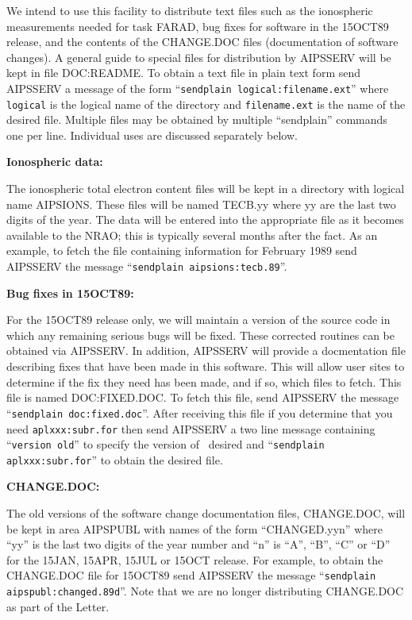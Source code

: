    We intend to use this facility to distribute text files such as the
ionospheric measurements needed for task FARAD, bug fixes for software
in the 15OCT89 release, and the contents of the CHANGE.DOC files
(documentation of software changes).  A general guide to special files
for distribution by AIPSSERV will be kept in file DOC:README.  To
obtain a text file in plain text form send AIPSSERV a message of the
form ``{\tt sendplain logical:filename.ext}'' where {\tt logical} is the
logical name of the directory and {\tt filename.ext} is the name of the
desired file.  Multiple files may be obtained by multiple
``sendplain'' commands one per line.  Individual uses are discussed
separately below.

{\bf Ionospheric data:}

   The ionospheric total electron content files will be kept in a
directory with logical name AIPSIONS.  These files  will be named
TECB.yy where yy are the last two digits of the year.  The data will
be entered into the appropriate file as it becomes available to the
NRAO; this is typically several months after the fact.
As an example, to fetch the file containing information for
February 1989 send AIPSSERV the message ``{\tt sendplain
aipsions:tecb.89}''.


{\bf Bug fixes in 15OCT89:}

   For the 15OCT89 release only, we will maintain a version of the
source code in which any remaining serious bugs will be fixed.  These
corrected routines can be obtained via AIPSSERV.  In addition,
AIPSSERV will provide a docmentation file describing fixes that have
been made in this software.  This will allow user sites to determine
if the fix they need has been made, and if so, which files to fetch.
This file is named DOC:FIXED.DOC.  To fetch this file, send AIPSSERV
the message ``{\tt sendplain doc:fixed.doc}''.  After receiving this
file if you determine that you need {\tt aplxxx:subr.for} then send
AIPSSERV a two line message containing ``{\tt version old}'' to
specify the version of \AIPS\ desired and ``{\tt sendplain
aplxxx:subr.for}'' to obtain the desired file.

{\bf CHANGE.DOC:}

   The old versions of the software change documentation files,
CHANGE.DOC, will be kept in area AIPSPUBL with names of the form
``CHANGED.yyn'' where ``yy'' is the last two digits of the year number
and ``n'' is ``A'', ``B'', ``C'' or ``D'' for the 15JAN, 15APR, 15JUL
or 15OCT release.  For example, to obtain the CHANGE.DOC file for
15OCT89 send AIPSSERV the message ``{\tt sendplain
aipspubl:changed.89d}''.  Note that we are no longer distributing
CHANGE.DOC as part of the \AIPS Letter.


